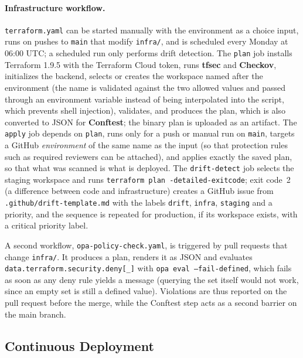 \paragraph{Infrastructure workflow.} \texttt{terraform.yaml} can be started manually with the environment as a choice input, runs on pushes to \texttt{main} that modify \texttt{infra/}, and is scheduled every Monday at 06:00 UTC; a scheduled run only performs drift detection. The \texttt{plan} job installs Terraform 1.9.5 with the Terraform Cloud token, runs \textbf{tfsec} and \textbf{Checkov}, initializes the backend, selects or creates the workspace named after the environment (the name is validated against the two allowed values and passed through an environment variable instead of being interpolated into the script, which prevents shell injection), validates, and produces the plan, which is also converted to JSON for \textbf{Conftest}; the binary plan is uploaded as an artifact. The \texttt{apply} job depends on \texttt{plan}, runs only for a push or manual run on \texttt{main}, targets a GitHub \emph{environment} of the same name as the input (so that protection rules such as required reviewers can be attached), and applies exactly the saved plan, so that what was scanned is what is deployed. The \texttt{drift-detect} job selects the staging workspace and runs \texttt{terraform plan -detailed-exitcode}; exit code~2 (a difference between code and infrastructure) creates a GitHub issue from \texttt{.github/drift-template.md} with the labels \texttt{drift}, \texttt{infra}, \texttt{staging} and a priority, and the sequence is repeated for production, if its workspace exists, with a critical priority label.

A second workflow, \texttt{opa-policy-check.yaml}, is triggered by pull requests that change \texttt{infra/}. It produces a plan, renders it as JSON and evaluates \texttt{data.terraform.security.deny[\_]} with \texttt{opa eval --fail-defined}, which fails as soon as any deny rule yields a message (querying the set itself would not work, since an empty set is still a defined value). Violations are thus reported on the pull request before the merge, while the Conftest step acts as a second barrier on the main branch.

\subsection{Continuous Deployment}
\label{sec:impl-cd}


